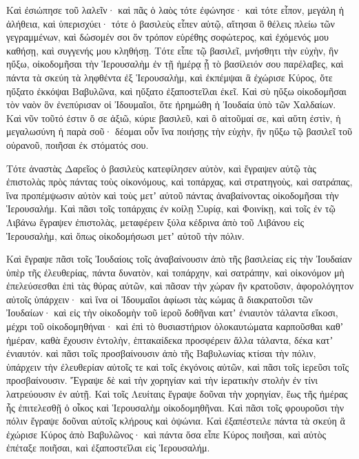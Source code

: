 {\par }{\PP {}Καὶ ἐσιώπησε τοῦ λαλεῖν· καὶ πᾶς ὁ λαὸς τότε ἐφώνησε· καὶ τότε εἶπον, μεγάλη ἡ ἀλήθεια, καὶ ὑπερισχύει·
τότε ὁ βασιλεὺς εἶπεν αὐτῷ, αἴτησαι ὃ θέλεις πλείω τῶν γεγραμμένων, καὶ δώσομέν σοι ὅν τρόπον εὑρέθης σοφώτερος, καὶ ἐχόμενός μου καθήσῃ, καὶ συγγενής μου κληθήσῃ.
Τότε εἶπε τῷ βασιλεῖ, μνήσθητι τὴν εὐχὴν, ἣν ηὔξω, οἰκοδομῆσαι τὴν Ἱερουσαλὴμ ἐν τῇ ἡμέρᾳ ᾗ τὸ βασίλειόν σου παρέλαβες,
καὶ πάντα τὰ σκεύη τὰ ληφθέντα ἐξ Ἱερουσαλὴμ, καὶ ἐκπέμψαι ἃ ἐχώρισε Κύρος, ὅτε ηὔξατο ἐκκόψαι Βαβυλῶνα, καὶ ηὔξατο ἐξαποστεῖλαι ἐκεῖ.
Καὶ σὺ ηὔξω οἰκοδομῆσαι τὸν ναὸν ὃν ἐνεπύρισαν οἱ Ἰδουμαῖοι, ὅτε ἠρημώθη ἡ Ἰουδαία ὑπὸ τῶν Χαλδαίων.
Καὶ νῦν τοῦτό ἐστιν ὅ σε ἀξιῶ, κύριε βασιλεῦ, καὶ ὃ αἰτοῦμαί σε, καὶ αὕτη ἐστὶν, ἡ μεγαλωσύνη ἡ παρὰ σοῦ· δέομαι οὖν ἵνα ποιήσῃς τὴν εὐχὴν, ἣν ηὔξω τῷ βασιλεῖ τοῦ οὐρανοῦ, ποιῆσαι ἐκ στόματός σου.
\par }{\PP {}Τότε ἀναστὰς Δαρεῖος ὁ βασιλεὺς κατεφίλησεν αὐτὸν, καὶ ἔγραψεν αὐτῷ τὰς ἐπιστολὰς πρὸς πάντας τοὺς οἰκονόμους, καὶ τοπάρχας, καὶ στρατηγοὺς, καὶ σατράπας, ἵνα προπέμψωσιν αὐτὸν καὶ τοὺς μετʼ αὐτοῦ πάντας ἀναβαίνοντας οἰκοδομῆσαι τὴν Ἱερουσαλήμ.
Καὶ πᾶσι τοῖς τοπάρχαις ἐν κοίλῃ Συρίᾳ, καὶ Φοινίκῃ, καὶ τοῖς ἐν τῷ Λιβάνω ἔγραψεν ἐπιστολὰς, μεταφέρειν ξύλα κέδρινα ἀπὸ τοῦ Λιβάνου εἰς Ἱερουσαλὴμ, καὶ ὅπως οἰκοδομήσωσι μετʼ αὐτοῦ τὴν πόλιν.
\par }{\PP {}Καὶ ἔγραψε πᾶσι τοῖς Ἰουδαίοις τοῖς ἀναβαίνουσιν ἀπὸ τῆς βασιλείας εἰς τὴν Ἰουδαίαν ὑπὲρ τῆς ἐλευθερίας, πάντα δυνατὸν, καὶ τοπάρχην, καὶ σατράπην, καὶ οἰκονόμον μὴ ἐπελεύσεσθαι ἑπὶ τὰς θύρας αὐτῶν,
καὶ πᾶσαν τὴν χώραν ἣν κρατοῦσιν, ἀφορολόγητον αὐτοῖς ὑπάρχειν· καὶ ἵνα οἱ Ἰδουμαῖοι ἀφίωσι τὰς κώμας ἃ διακρατοῦσι τῶν Ἰουδαίων·
καὶ εἰς τὴν οἰκοδομὴν τοῦ ἱεροῦ δοθῆναι κατʼ ἐνιαυτὸν τάλαντα εἴκοσι, μέχρι τοῦ οἰκοδομηθήναι·
καὶ ἐπὶ τὸ θυσιαστήριον ὁλοκαυτώματα καρποῦσθαι καθʼ ἡμέραν, καθὰ ἔχουσιν ἐντολὴν, ἑπτακαίδεκα προσφέρειν ἄλλα τάλαντα, δέκα κατʼ ἐνιαυτόν.
καὶ πᾶσι τοῖς προσβαίνουσιν ἀπὸ τῆς Βαβυλωνίας κτίσαι τὴν πόλιν, ὑπάρχειν τὴν ἐλευθερίαν αὐτοῖς τε καὶ τοῖς ἐκγόνοις αὐτῶν, καὶ πᾶσι τοῖς ἱερεῦσι τοῖς προσβαίνουσιν.
Ἔγραψε δὲ καὶ τὴν χορηγίαν καὶ τὴν ἱερατικὴν στολὴν ἐν τίνι λατρεύουσιν ἐν αὐτῇ.
Καὶ τοῖς Λευίταις ἔγραψε δοῦναι τὴν χορηγίαν, ἕως τῆς ἡμέρας ἧς ἐπιτελεσθῇ ὁ οἶκος καὶ Ἱερουσαλὴμ οἰκοδομηθῆναι.
Καὶ πᾶσι τοῖς φρουροῦσι τὴν πόλιν ἔγραψε δοῦναι αὐτοῖς κλήρους καὶ ὀψώνια.
Καὶ ἐξαπέστειλε πάντα τὰ σκεύη ἃ ἐχώρισε Κύρος ἀπὸ Βαβυλῶνος· καὶ πάντα ὅσα εἶπε Κύρος ποιῆσαι, καὶ αὐτὸς ἐπέταξε ποιῆσαι, καὶ ἐξαποστεῖλαι εἰς Ἱερουσαλήμ.
}
